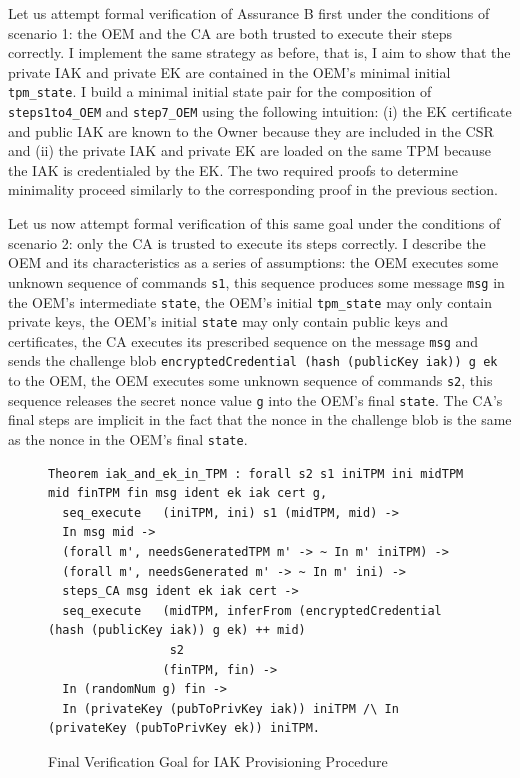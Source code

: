 \documentclass[runningheads]{llncs}
\begin{document}
Let us attempt formal verification of Assurance B first under the conditions of scenario 1: the OEM and the CA are both trusted to execute their steps correctly. I implement the same strategy as before, that is, I aim to show that the private IAK and private EK are contained in the OEM's minimal initial \verb|tpm_state|. I build a minimal initial state pair for the composition of \verb|steps1to4_OEM| and \verb|step7_OEM| using the following intuition: (i) the EK certificate and public IAK are known to the Owner because they are included in the CSR and (ii) the private IAK and private EK are loaded on the same TPM because the IAK is credentialed by the EK. The two required proofs to determine minimality proceed similarly to the corresponding proof in the previous section.

Let us now attempt formal verification of this same goal under the conditions of scenario 2: only the CA is trusted to execute its steps correctly. 
I describe the OEM and its characteristics as a series of assumptions: the OEM executes some unknown sequence of commands \verb|s1|, this sequence produces some message \verb|msg| in the OEM's intermediate \verb|state|, the OEM's initial \verb|tpm_state| may only contain private keys, the OEM's initial \verb|state| may only contain public keys and certificates, the CA executes its prescribed sequence on the message \verb|msg| and sends the challenge blob \verb|encryptedCredential (hash (publicKey iak)) g ek| to the OEM, the OEM executes some unknown sequence of commands \verb|s2|, this sequence releases the secret nonce value \verb|g| into the OEM's final \verb|state|. The CA's final steps are implicit in the fact that the nonce in the challenge blob is the same as the nonce in the OEM's final \verb|state|. 
\begin{figure}[h]
\begin{lstlisting}[language=Coq]
Theorem iak_and_ek_in_TPM : forall s2 s1 iniTPM ini midTPM mid finTPM fin msg ident ek iak cert g,
  seq_execute   (iniTPM, ini) s1 (midTPM, mid) -> 
  In msg mid ->
  (forall m', needsGeneratedTPM m' -> ~ In m' iniTPM) ->
  (forall m', needsGenerated m' -> ~ In m' ini) ->
  steps_CA msg ident ek iak cert ->
  seq_execute   (midTPM, inferFrom (encryptedCredential (hash (publicKey iak)) g ek) ++ mid) 
                 s2 
                (finTPM, fin) ->
  In (randomNum g) fin ->
  In (privateKey (pubToPrivKey iak)) iniTPM /\ In (privateKey (pubToPrivKey ek)) iniTPM.
\end{lstlisting}
\caption{Final Verification Goal for IAK Provisioning Procedure}
\label{fig:iak_goal}
\end{figure}
\end{document}
